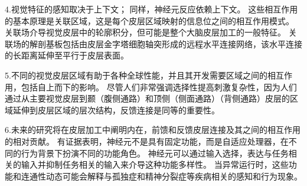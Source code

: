 4.视觉特征的感知取决于上下文；
同样，神经元反应依赖上下文。
这些相互作用的基本原理是关联区域，这是每个皮层区域映射的信息位之间的相互作用模式。
关联场介导视觉皮层中的轮廓积分，但可能是整个大脑皮层加工的一般特征。
关联场的解剖基板包括由皮层金字塔细胞轴突形成的远程水平连接网络，该水平连接的长距离延伸至平行于皮层表面。 


5.不同的视觉皮层区域有助于各种全球性能，并且其开发需要区域之间的相互作用，包括自上而下的影响。
尽管人们非常强调选择性提高刺激复杂性，因为人们通过从主要视觉皮层到颞（腹侧通路）和顶侧（侧面通路）（背侧通路）皮层的区域延伸到皮层区域的层次结构，反馈连接是同等的重要性。 


6.未来的研究将在皮层加工中阐明内在，前馈和反馈皮层连接及其之间的相互作用的相对贡献。
有证据表明，神经元不是具有固定功能，而是自适应处理器，在不同的行为背景下扮演不同的功能角色。
神经元可以通过输入选择，表达与任务相关的输入并抑制任务相关的输入来介导这种功能多样性。
当异常运行时，这些功能和连通性动态可能会解释与孤独症和精神分裂症等疾病相关的感知和行为现象。

